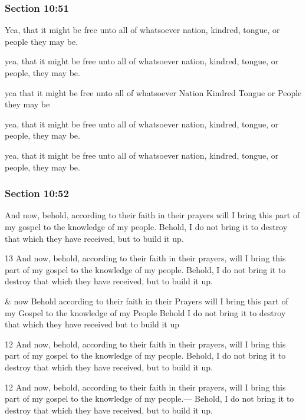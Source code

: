 	\subsubsection{Section 10:51} %
		\label{DC10-51}

		Yea, that it might be free unto all of whatsoever nation, kindred, tongue, or people they may be.

		\begin{framed}
		\scriptsize
			\begin{compactdesc}
				\item[JSP] yea, that it might be free unto all of whatsoever nation, kindred, tongue, or people, they may be.
				\item[RB1] yea that it might be free unto all of whatsoever Nation Kindred Tongue or People they may be
				\item[DC 1835] yea, that it might be free unto all of whatsoever nation, kindred, tongue, or people, they may be.
				\item[DC 1844] yea, that it might be free unto all of whatsoever nation, kindred, tongue, or people, they may be.
			\end{compactdesc}
		\end{framed}

	\subsubsection{Section 10:52} %
		\label{DC10-52}

		And now, behold, according to their faith in their prayers will I bring this part of my gospel to the knowledge of my people.  Behold, I do not bring it to destroy that which they have received, but to build it up.

		\begin{framed}
		\scriptsize
			\begin{compactdesc}
				\item[JSP] 13 And now, behold, according to their faith in their prayers, will I bring this part of my gospel to the knowledge of my people. Behold, I do not bring it to destroy that which they have received, but to build it up.
				\item[RB1] \& now Behold according to their faith in their Prayers will I bring this part of my Gospel to the knowledge of my People Behold I do not bring it to destroy that which they have received but to build it up
				\item[DC 1835] 12 And now, behold, according to their faith in their prayers, will I bring this part of my gospel to the knowledge of my people. Behold, I do not bring it to destroy that which they have received, but to build it up.
				\item[DC 1844] 12 And now, behold, according to their faith in their prayers, will I bring this part of my gospel to the knowledge of my people.--- Behold, I do not bring it to destroy that which they have received, but to build it up.
			\end{compactdesc}
		\end{framed}

